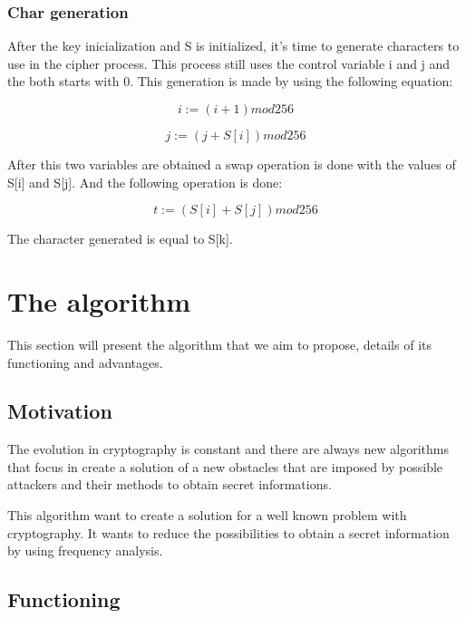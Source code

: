 \documentclass{llncs}
\begin{document}
\subsubsection{Char generation}

After the key inicialization and S is initialized, it's time to generate characters to use in the cipher process. This process still uses the control variable i and j and the both starts with 0. This generation is made by using the following equation:

\begin{equation}
 i := (i + 1) mod 256
\end{equation}

\begin{equation}
 j := (j + S[i]) mod 256
\end{equation}

After this two variables are obtained a swap operation is done with the values of S[i] and S[j]. And the following operation is done:

\begin{equation}
 t := (S[i] + S[j]) mod 256
\end{equation}

The character generated is equal to S[k].

\section{The algorithm}

This section will present the algorithm that we aim to propose, details of its functioning and advantages.

\subsection{Motivation}

The evolution in cryptography is constant and there are always new algorithms that focus in create a solution of a new obstacles that are imposed by possible attackers and their methods to obtain secret informations. 

This algorithm want to create a solution for a well known problem with cryptography. It wants to  reduce  the possibilities to obtain a secret information by using frequency analysis.

\subsection{Functioning}
\end{document}
